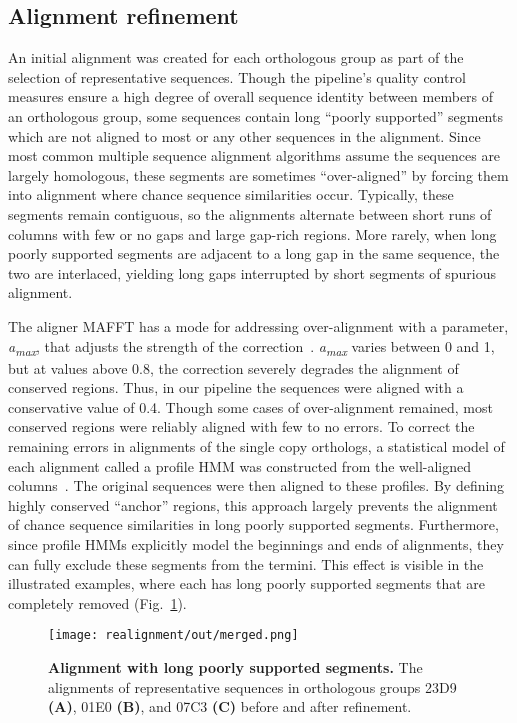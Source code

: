 \subsection*{Alignment refinement}
An initial alignment was created for each orthologous group as part of the selection of representative sequences. Though the pipeline’s quality control measures ensure a high degree of overall sequence identity between members of an orthologous group, some sequences contain long “poorly supported” segments which are not aligned to most or any other sequences in the alignment. Since most common multiple sequence alignment algorithms assume the sequences are largely homologous, these segments are sometimes “over-aligned” by forcing them into alignment where chance sequence similarities occur. Typically, these segments remain contiguous, so the alignments alternate between short runs of columns with few or no gaps and large gap-rich regions. More rarely, when long poorly supported segments are adjacent to a long gap in the same sequence, the two are interlaced, yielding long gaps interrupted by short segments of spurious alignment.

The aligner MAFFT has a mode for addressing over-alignment with a parameter, \textit{a\textsubscript{max}}, that adjusts the strength of the correction~\cite{Katoh2013, Katoh2016}. \textit{a\textsubscript{max}} varies between 0 and 1, but at values above 0.8, the correction severely degrades the alignment of conserved regions. Thus, in our pipeline the sequences were aligned with a conservative value of 0.4. Though some cases of over-alignment remained, most conserved regions were reliably aligned with few to no errors. To correct the remaining errors in alignments of the single copy orthologs, a statistical model of each alignment called a profile HMM was constructed from the well-aligned columns~\cite{Eddy2009}. The original sequences were then aligned to these profiles. By defining highly conserved “anchor” regions, this approach largely prevents the alignment of chance sequence similarities in long poorly supported segments. Furthermore, since profile HMMs explicitly model the beginnings and ends of alignments, they can fully exclude these segments from the termini. This effect is visible in the illustrated examples, where each has long poorly supported segments that are completely removed (Fig.~\ref{fig:realignment}).

\begin{figure}[h!]
\texttt{[image: realignment/out/merged.png]}
\centering
\caption{\textbf{Alignment with long poorly supported segments.}
The alignments of representative sequences in orthologous groups 23D9 \textbf{(A)}, 01E0 \textbf{(B)}, and 07C3 \textbf{(C)} before and after refinement.}
\label{fig:realignment}
\end{figure}

